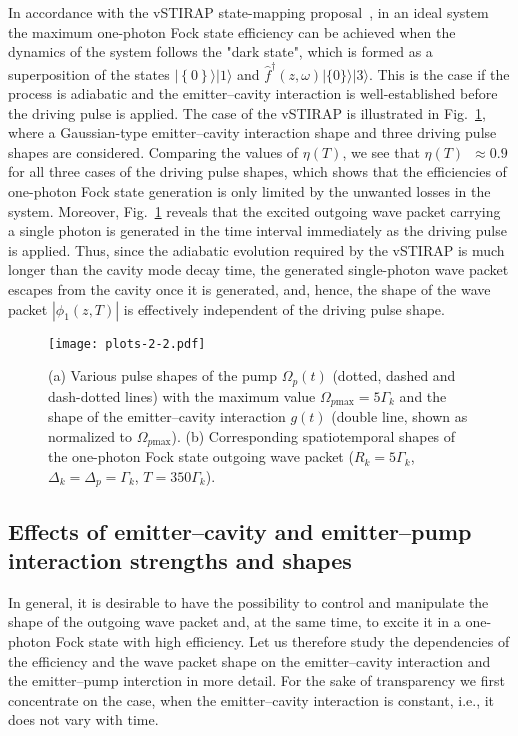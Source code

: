 \documentclass[pra, twocolumn]{revtex4}
\begin{document}
%
In accordance
with the vSTIRAP state-mapping proposal~\cite{parkins:3095, law:1055},
in an ideal system
the
maximum one-photon Fock state
efficiency can be achieved when the dynamics of the system follows the
"dark state", which is formed as a superposition of the states
$|\!\left\lbrace0\right\rbrace\!\rangle|1\rangle$ and
$\hat{f}^{\dagger}(z, \omega)|\{0\}\rangle|3\rangle$. This is the case
if the process is adiabatic and the emitter--cavity interaction is
well-established before the driving pulse is
applied.
The case of the vSTIRAP 
is illustrated in Fig.~\ref{fig2}, where a Gaussian-type
emitter--cavity interaction shape and three driving pulse shapes are
considered.   
Comparing the values of $\eta(T)$, 
we see that
\mbox{$\eta(T)$ $\!\approx 0.9$} for all three cases of the driving
pulse shapes, which shows that
the efficiencies of one-photon Fock state generation is
only limited by the unwanted losses in the system.
%
%
Moreover, Fig.~\ref{fig2} reveals that the excited outgoing wave packet carrying
a single photon is generated in the time interval immediately as the
driving pulse is applied. Thus,
% 
since the adiabatic evolution required by the vSTIRAP is much longer than
the cavity mode decay time,
the generated single-photon wave packet
escapes from the cavity once it is generated, and, hence,
the shape of the wave packet
$|\phi_1(z,T)|$ is effectively independent of the driving pulse
%
shape.


%
\begin{figure}[t!]
        \texttt{[image: plots-2-2.pdf]}
	\caption{
          (a)
%         
           Various pulse
           shapes
           of the
%          
           pump
           $\Omega_{p}(t)$ (dotted, dashed and
           dash-dotted lines) with the maximum value
           $\Omega_{p\mathrm{max}} = 5\Gamma_k $ and the
%          
           shape
           of the emitter--cavity
           interaction $g(t)$ (double line, shown as normalized to $\Omega_{p\mathrm{max}}$).
           (b) Corresponding spatiotemporal shapes of the 
           one-photon Fock state
           outgoing wave packet
%           
           ($R_k = 5\Gamma_k$,
           $\Delta_k = \Delta_p =  \Gamma_k$, $T = 350 \Gamma_k$).
}
	\label{fig2}
\end{figure}

\subsection{
Effects of emitter--cavity and emitter--pump interaction strengths and shapes
}
\label{sec5.3}
In general,
it is desirable to have
the possibility to control and manipulate
the shape
of the outgoing wave packet
and, at the same time, to
excite
it
in a one-photon Fock state with high efficiency.
Let us therefore study the dependencies of the efficiency and the wave packet shape
on the emitter--cavity interaction and the emitter--pump interction in more detail.
For the sake of transparency
we first concentrate on the case, when
the emitter--cavity interaction is
constant, i.e., it does not vary with time.
\end{document}
